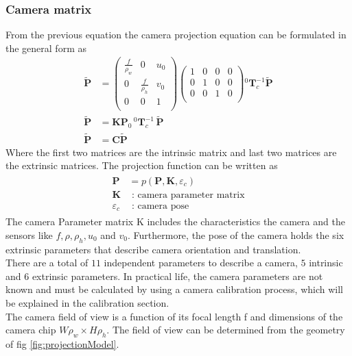 \documentclass[journal,final,a4paper,twoside]{PS}
\begin{document}
\subsubsection{Camera matrix}
\label{sec:camMatrix}
From the previous equation the camera projection equation can be formulated in the general form as
\begin{subequations}\begin{align}
\tilde{\textbf{P}}&= \begin{pmatrix}
\frac{f}{\rho_w}&0&u_0\\
0&\frac{f}{\rho_h}&v_0\\
0&0&1\\
\end{pmatrix}\begin{pmatrix}
1&0&0&0\\
0&1&0&0\\
0&0&1&0\\
\end{pmatrix}{}^{0}\textbf{T}_c^{-1}\tilde{\textbf{P}}\\
\tilde{\textbf{P}}&= \textbf{K}\textbf{P}_0 \,{}^{0}\textbf{T}^{-1}_c\,\tilde{\textbf{P}}\\
\tilde{\textbf{P}}&= \textbf{C}\tilde{\textbf{P}}
\end{align}
\end{subequations}
Where the first two matrices are the intrinsic matrix and last two matrices are the extrinsic matrices.
The projection function can be written as\cite{Corke}
\begin{align}\begin{split}
\textbf{P}&=p(\textbf{P},\textbf{K},\varepsilon_c)\\
\textbf{K}&\text{ : camera parameter matrix}\\
\varepsilon_c&\text{ : camera pose}\end{split}
\end{align}
The camera Parameter matrix K includes the characteristics the camera and the sensors like $f,\rho,\rho_h,u_0$ and $v_0$. Furthermore, the pose of the camera holds the six extrinsic parameters that describe camera orientation and translation.
\\
There are a total of $11$ independent parameters to describe a camera, $5$ intrinsic and $6$ extrinsic parameters. In practical life, the camera parameters are not known and must be calculated by using a camera calibration process, which will be explained in the calibration section.
\\
The camera field of view is a function of its focal length f  and dimensions of the camera chip $W\rho_w  \times  H\rho_h$. The field of view can be determined from the geometry of fig \ref{fig:projectionModel}.
\end{document}
